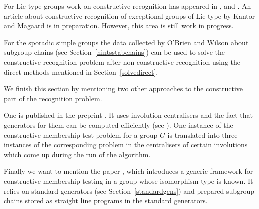 For Lie type groups work on constructive recognition has appeared in
\cite{recogSL3}, \cite{rybaid} and \cite{suzukiconstr}. An article about 
constructive recognition of exceptional groups of Lie type by Kantor and Magaard is
in preparation. However, this area is still work in progress.

For the sporadic simple groups the data collected by O'Brien and Wilson
about subgroup chains (see Section~\ref{hintsstabchains}) can be used to
solve the constructive recognition problem after non-con\-struc\-tive
recognition using the direct methods mentioned in
Section~\ref{solvedirect}. 

We finish this section by mentioning two other approaches to the
constructive part of the recognition problem.

One is published
in the preprint \cite{bbconstrmember}. It uses involution centralisers
and the fact that generators for them can be computed efficiently (see
\cite{BrayInv}). One instance of the constructive membership test problem
for a group $G$ is translated into three instances of the corresponding
problem in the centralisers of certain involutions which come up during the
run of the algorithm.

Finally we want to mention the paper \cite{gensift}, which introduces a
generic framework for constructive membership testing in a group whose
isomorphism type is known. It relies on standard generators (see
Section~\ref{standardgens}) and prepared subgroup chains stored as straight
line programs in the standard generators.

